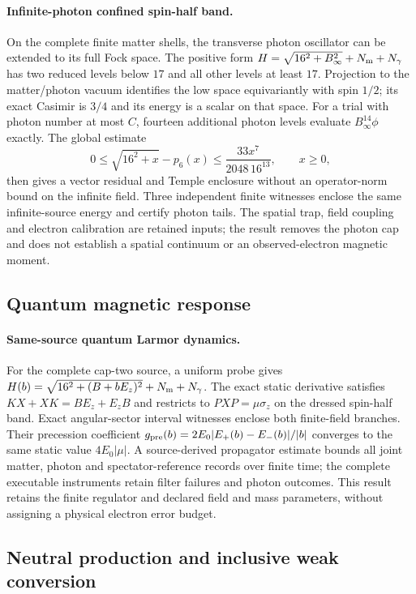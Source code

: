 \paragraph{Infinite-photon confined spin-half band.}
On the complete finite matter shells, the transverse photon oscillator can
be extended to its full Fock space. The positive form
$H=\sqrt{16^2+B_\infty^2}+N_{\rm m}+N_\gamma$ has two reduced levels below
$17$ and all other levels at least $17$. Projection to the matter/photon
vacuum identifies the low space equivariantly with spin $1/2$; its exact
Casimir is $3/4$ and its energy is a scalar on that space.
For a trial with photon number at most $C$, fourteen additional photon
levels evaluate $B_\infty^{14}\phi$ exactly. The global estimate
\[
0\leq\sqrt{16^2+x}-p_6(x)
 \leq \frac{33x^7}{2048\,16^{13}},\qquad x\geq0,
\]
then gives a vector residual and Temple enclosure without an operator-norm
bound on the infinite field. Three independent finite witnesses enclose the
same infinite-source energy and certify photon tails. The spatial trap,
field coupling and electron calibration are retained inputs; the result
removes the photon cap and does not establish a spatial continuum or an
observed-electron magnetic moment.


\subsection{Quantum magnetic response}


\paragraph{Same-source quantum Larmor dynamics.}
For the complete cap-two source, a uniform probe gives
$H(b)=\sqrt{16^2+(B+bE_z)^2}+N_{\rm m}+N_\gamma$.
The exact static derivative satisfies $KX+XK=BE_z+E_zB$ and restricts to
$PXP=\mu\sigma_z$ on the dressed spin-half band. Exact angular-sector
interval witnesses enclose both finite-field branches. Their precession
coefficient $g_{\rm pre}(b)=2E_0|E_+(b)-E_-(b)|/|b|$ converges to the
same static value $4E_0|\mu|$. A source-derived propagator estimate bounds
all joint matter, photon and spectator-reference records over finite time;
the complete executable instruments retain filter failures and photon
outcomes. This result retains the finite regulator and declared field and
mass parameters, without assigning a physical electron error budget.


\subsection{Neutral production and inclusive weak conversion}


